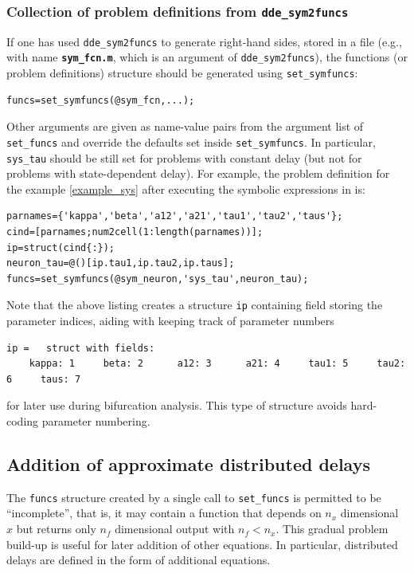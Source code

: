 \documentclass[10pt]{scrartcl}
\newcommand{\file}[1]{\textbf{\texttt{#1}}}
\newcommand{\blist}[1]{\mbox{\lstinline!#1!}}
\begin{document}
\subsubsection{Collection of problem definitions from \blist{dde_sym2funcs}}
\label{sec:symfuncs}
If one has used \blist{dde_sym2funcs} to generate right-hand sides,
stored in a file (e.g., with name \file{sym\_fcn.m}, which is an
argument of \blist{dde_sym2funcs}), the functions (or problem
definitions) structure should be generated using \blist{set_symfuncs}:
\begin{lstlisting}
funcs=set_symfuncs(@sym_fcn,...);
\end{lstlisting}
Other arguments are given as name-value pairs from the argument list
of \blist{set_funcs} and override the defaults set inside
\blist{set_symfuncs}. In particular, \blist{sys_tau} should be still
set for problems with constant delay (but not for problems with
state-dependent delay). For example, the problem definition for the example \eqref{example_sys} after executing the symbolic expressions in  is:
\begin{lstlisting}
parnames={'kappa','beta','a12','a21','tau1','tau2','taus'};
cind=[parnames;num2cell(1:length(parnames))];
ip=struct(cind{:});
neuron_tau=@()[ip.tau1,ip.tau2,ip.taus];
funcs=set_symfuncs(@sym_neuron,'sys_tau',neuron_tau);
\end{lstlisting}
Note that the above listing creates a structure \blist{ip} containing field storing the parameter indices, aiding with keeping track of parameter numbers
\begin{lstlisting}
ip =   struct with fields:
    kappa: 1     beta: 2      a12: 3      a21: 4     tau1: 5     tau2: 6     taus: 7
\end{lstlisting}
for later use during bifurcation analysis. This type of structure avoids hard-coding parameter numbering.
\subsection{Addition of approximate distributed delays}
\label{sec:dist_delays}
The \blist{funcs} structure created by a single call to
\blist{set_funcs} is permitted to be ``incomplete'', that is, it may
contain a function that depends on $n_x$ dimensional $x$ but returns only
$n_f$ dimensional output with $n_f<n_x$. This gradual problem build-up
is useful for later addition of other equations. In particular,
distributed delays are defined in the form of additional equations.
\end{document}
